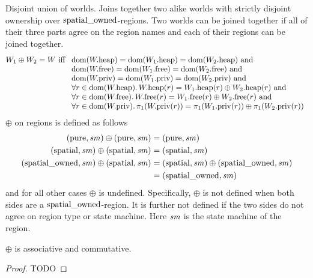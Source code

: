 \documentclass[a4paper]{article}
\begin{document}
Disjoint union of worlds. Joins together two alike worlds with strictly disjoint ownership over $\spatialo$-regions. Two worlds can be joined together if all of their three parts agree on the region names and each of their regions can be joined together.
\[
  W_1 \oplus W_2 = W
  \text{ iff }
  \begin{array}[t]{l}
    \text{$\dom(\pwheap) = \dom(\pwheap[W_1]) = \dom(\pwheap[W_2]) \tand$} \\
    \text{$\dom(\pwfree) = \dom(\pwfree[W_1]) = \dom(\pwfree[W_2]) \tand$} \\
    \text{$\dom(\pwpriv) = \dom(\pwpriv[W_1]) = \dom(\pwpriv[W_2]) \tand$} \\
    \forall r \in \dom(\pwheap) \ldotp \pwheap(r) = \pwheap[W_1](r) \oplus \pwheap[W_2](r) \tand \\
    \forall r \in \dom(\pwfree) \ldotp \pwfree(r) = \pwfree[W_1](r) \oplus \pwfree[W_2](r) \tand \\
    \forall r \in \dom(\pwpriv) \ldotp \pi_1(\pwpriv(r)) = \pi_1(\pwpriv[W_1](r)) \oplus \pi_1(\pwpriv[W_2](r))
  \end{array}
\]
$\oplus$ on regions is defined as follows
\begin{align*}
  (\pure,\var{sm}) \oplus (\pure,\var{sm}) =  & \; (\pure,\var{sm}) \\
  (\spatial,\var{sm}) \oplus (\spatial,\var{sm}) =  & \; (\spatial,\var{sm}) \\
  (\spatialo,\var{sm}) \oplus (\spatial,\var{sm}) = & \; (\spatial,\var{sm}) \oplus (\spatialo,\var{sm})\\
                                           =  & \; (\spatialo,\var{sm})
\end{align*}
and for all other cases $\oplus$ is undefined. Specifically, $\oplus$ is not defined when both sides are a $\spatialo$-region. It is further not defined if the two sides do not agree on region type or state machine. Here $\var{sm}$ is the state machine of the region.

\begin{lemma}
  $\oplus$ is associative and commutative.
\end{lemma}
\begin{proof}
  TODO
\end{proof}
\end{document}
